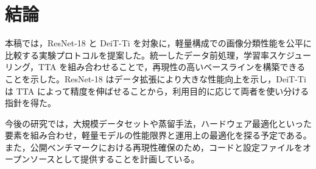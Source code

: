 \section{結論}\label{sec:conclusion}
本稿では，ResNet-18 と DeiT-Ti を対象に，軽量構成での画像分類性能を公平に比較する実験プロトコルを提案した。統一したデータ前処理，学習率スケジューリング，TTA を組み合わせることで，再現性の高いベースラインを構築できることを示した。ResNet-18 はデータ拡張により大きな性能向上を示し，DeiT-Ti は TTA によって精度を伸ばせることから，利用目的に応じて両者を使い分ける指針を得た。

今後の研究では，大規模データセットや蒸留手法，ハードウェア最適化といった要素を組み合わせ，軽量モデルの性能限界と運用上の最適化を探る予定である。また，公開ベンチマークにおける再現性確保のため，コードと設定ファイルをオープンソースとして提供することを計画している。
